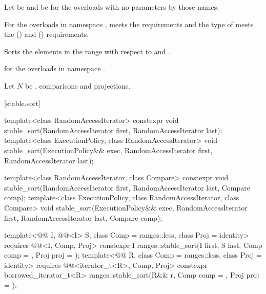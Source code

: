 \begin{itemdescr}
\pnum
Let  be 
and  be 
for the overloads with no parameters by those names.

\pnum
\expects
For the overloads in namespace ,
 meets
the  requirements and
the type of  meets
the  () and
 () requirements.

\pnum
\effects
Sorts the elements in the range 
with respect to  and .

\pnum
\returns
{} for the overloads in namespace .

\pnum
\complexity
Let $N$ be .
 comparisons and projections.
\end{itemdescr}

[stable.sort]{}

%
\begin{itemdecl}
template<class RandomAccessIterator>
  constexpr void stable_sort(RandomAccessIterator first, RandomAccessIterator last);
template<class ExecutionPolicy, class RandomAccessIterator>
  void stable_sort(ExecutionPolicy&& exec,
                   RandomAccessIterator first, RandomAccessIterator last);

template<class RandomAccessIterator, class Compare>
  constexpr void stable_sort(RandomAccessIterator first, RandomAccessIterator last,
                             Compare comp);
template<class ExecutionPolicy, class RandomAccessIterator, class Compare>
  void stable_sort(ExecutionPolicy&& exec,
                   RandomAccessIterator first, RandomAccessIterator last,
                   Compare comp);

template<@@ I, @@<I> S, class Comp = ranges::less,
         class Proj = identity>
  requires @@<I, Comp, Proj>
  constexpr I ranges::stable_sort(I first, S last, Comp comp = {}, Proj proj = {});
template<@@ R, class Comp = ranges::less, class Proj = identity>
  requires @@<iterator_t<R>, Comp, Proj>
  constexpr borrowed_iterator_t<R>
    ranges::stable_sort(R&& r, Comp comp = {}, Proj proj = {});
\end{itemdecl}


